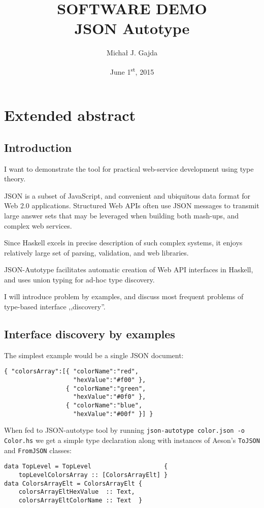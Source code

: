 \documentclass[11pt]{article}
\title{\textbf{{\large SOFTWARE DEMO}\\JSON Autotype\\
\vspace{5pt}{\large
Automatic bridge from untyped Web APIs
\\to typeful haven of Haskell}}}
\author{Micha\l{} J. Gajda}
\date{June 1\textsuperscript{st}, 2015}
\begin{document}
\maketitle

\section*{Extended abstract}
\subsection*{Introduction}
I want to demonstrate the tool for practical web-service development using type theory.

JSON is a subset of JavaScript, and convenient and ubiquitous data format for Web 2.0 applications. Structured Web APIs often use JSON messages to transmit large answer sets that may be leveraged when building both mash-ups, and complex web services.

Since Haskell excels in precise description of such complex systems, it enjoys relatively large set of parsing, validation, and web libraries.

JSON-Autotype facilitates automatic creation of Web API interfaces in Haskell, and uses union typing for ad-hoc type discovery.

I will introduce problem by examples, and discuss most frequent problems of type-based interface ,,discovery''.

\subsection*{Interface discovery by examples}

The simplest example would be a single JSON document:

\begin{verbatim}
{ "colorsArray":[{ "colorName":"red",
                   "hexValue":"#f00" },
                 { "colorName":"green",
                   "hexValue":"#0f0" },
                 { "colorName":"blue",
                   "hexValue":"#00f" }] }
\end{verbatim}

When fed to JSON-autotype tool by running \texttt{json-autotype color.json -o Color.hs} we get a simple type declaration along with instances of Aeson's \texttt{ToJSON} and \texttt{FromJSON} classes:

\begin{verbatim}
data TopLevel = TopLevel                    { 
    topLevelColorsArray :: [ColorsArrayElt] }
data ColorsArrayElt = ColorsArrayElt { 
    colorsArrayEltHexValue  :: Text,
    colorsArrayEltColorName :: Text  }
\end{verbatim}
\end{document}
